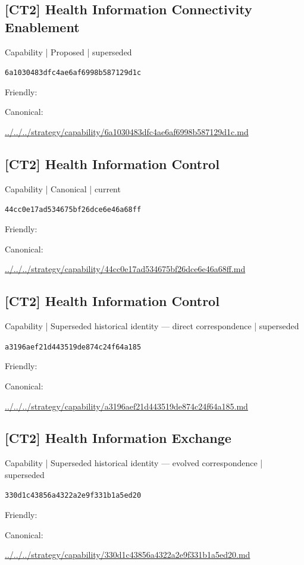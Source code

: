 \documentclass[10pt,a4paper]{article}
\begin{document}
\subsection*{[CT2] Health Information Connectivity Enablement}
{\small Capability | Proposed | superseded}\par
\texttt{6a1030483dfc4ae6af6998b587129d1c}\par
Friendly: \par
Canonical: \par
{\footnotesize\url{../../../strategy/capability/6a1030483dfc4ae6af6998b587129d1c.md}}\par
\subsection*{[CT2] Health Information Control}
{\small Capability | Canonical | current}\par
\texttt{44cc0e17ad534675bf26dce6e46a68ff}\par
Friendly: \par
Canonical: \par
{\footnotesize\url{../../../strategy/capability/44cc0e17ad534675bf26dce6e46a68ff.md}}\par
\subsection*{[CT2] Health Information Control}
{\small Capability | Superseded historical identity — direct correspondence | superseded}\par
\texttt{a3196aef21d443519de874c24f64a185}\par
Friendly: \par
Canonical: \par
{\footnotesize\url{../../../strategy/capability/a3196aef21d443519de874c24f64a185.md}}\par
\subsection*{[CT2] Health Information Exchange}
{\small Capability | Superseded historical identity — evolved correspondence | superseded}\par
\texttt{330d1c43856a4322a2e9f331b1a5ed20}\par
Friendly: \par
Canonical: \par
{\footnotesize\url{../../../strategy/capability/330d1c43856a4322a2e9f331b1a5ed20.md}}\par
\end{document}
